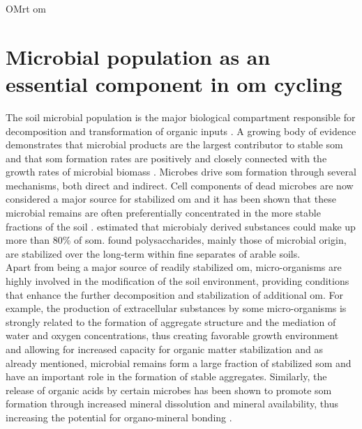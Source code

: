 	  OMrt om

\section{Microbial population as an essential component in \gls{om} cycling}

  	The soil microbial population is the major biological compartment responsible for decomposition and transformation of organic inputs \citep{thiet2006}. A growing body of evidence demonstrates that microbial products are the largest contributor to stable \gls{som} and that \gls{som} formation rates are positively and closely connected with the growth rates of microbial biomass \citep{kallenbach2016, kallenbach2015, ludwig2015, schurig2013, bradford2013}. Microbes drive \gls{som} formation through several mechanisms, both direct and indirect. Cell components of dead microbes are now considered a major source for stabilized \gls{om} \citep{kallenbach2015, liang2011, miltner2009} and it has been shown that these microbial remains are often preferentially concentrated in the more stable fractions of the soil \citep{ludwig2015}. \citet{liang2011} estimated that microbialy derived substances could make up more than 80\% of \gls{som}⁠.
  	\citet{kiem2003} found polysaccharides, mainly those of microbial origin, are stabilized over the long-term within fine separates of arable soils.\\
  	Apart from being a major source of readily stabilized \gls{om}, micro-organisms are highly involved in the  modification of the soil environment, providing conditions that enhance the further decomposition and stabilization of additional \gls{om}.  For example, the production of extracellular substances by some micro-organisms is strongly related to the formation of aggregate structure and the mediation of water and oxygen concentrations, thus creating favorable growth environment and allowing for increased capacity for organic matter stabilization \citep{schimel2012} ⁠and as already mentioned, microbial remains form a large fraction of stabilized \gls{som} and have an important role in the formation of stable aggregates. Similarly, the release of organic acids by certain microbes has been shown to promote \gls{som} formation through increased mineral dissolution and mineral availability, thus increasing the potential for organo-mineral bonding \citep{yu2018}.




